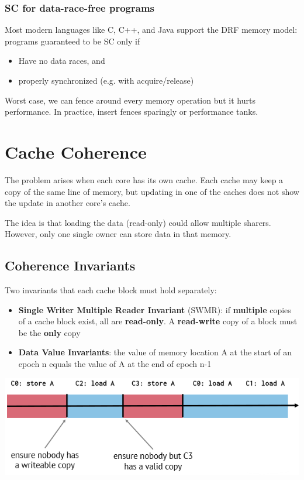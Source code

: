 \documentclass[letterpaper,12pt]{article}
\begin{document}
\subsubsection{SC for data-race-free programs}
Most modern languages like C, C++, and Java support the DRF memory model: programs guaranteed to be SC only if \begin{itemize}
    \item Have no data races, and
    \item properly synchronized (e.g. with acquire/release)
\end{itemize}
Worst case, we can fence around every memory operation but it hurts performance. In practice, insert fences sparingly or performance tanks.
\section{Cache Coherence}
The problem arises when each core has its own cache. Each cache may keep a copy of the same line of memory, but updating in one of the caches does not show the update in another core's cache.

The idea is that loading the data (read-only) could allow multiple sharers. However, only one single owner can store data in that memory.

\subsection{Coherence Invariants}
Two invariants that each cache block must hold separately:
\begin{itemize}
    \item \textbf{Single Writer Multiple Reader Invariant} (SWMR): if \textbf{multiple} copies of a cache block exist, all are \textbf{read-only}. A \textbf{read-write} copy of a block must be the \textbf{only} copy
    \item \textbf{Data Value Invariants}: the value of memory location A at the start of an epoch n equals the value of A at the end of epoch n-1
\end{itemize}
\includegraphics*{./Image/Coherence Invariants.png}
\end{document}

